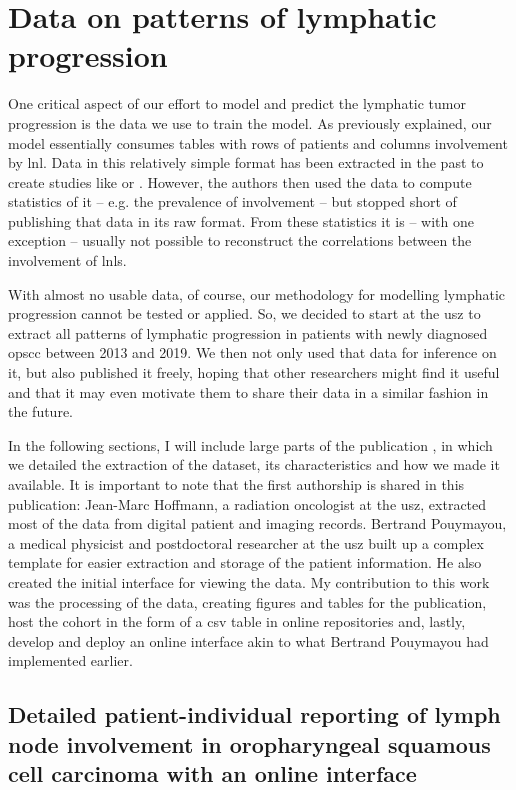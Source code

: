 \documentclass[\relativeRoot/main.tex]{subfiles}
\begin{document}
\chapter{Data on patterns of lymphatic progression}
\label{chap:dataset}

One critical aspect of our effort to model and predict the lymphatic tumor progression is the data we use to train the model. As previously explained, our model essentially consumes tables with rows of patients and columns involvement by \gls{lnl}. Data in this relatively simple format has been extracted in the past to create studies like \cite{candela_patterns_1990} or \cite{shah_patterns_1990}. However, the authors then used the data to compute statistics of it -- e.g. the prevalence of involvement -- but stopped short of publishing that data in its raw format. From these statistics it is -- with one exception \cite{sanguineti_defining_2009} -- usually not possible to reconstruct the correlations between the involvement of \glspl{lnl}.

With almost no usable data, of course, our methodology for modelling lymphatic progression cannot be tested or applied. So, we decided to start at the \gls{usz} to extract all patterns of lymphatic progression in patients with newly diagnosed \gls{opscc} between 2013 and 2019. We then not only used that data for inference on it, but also published it freely, hoping that other researchers might find it useful and that it may even motivate them to share their data in a similar fashion in the future.

In the following sections, I will include large parts of the publication \cite{ludwig_detailed_2022}, in which we detailed the extraction of the dataset, its characteristics and how we made it available. It is important to note that the first authorship is shared in this publication: Jean-Marc Hoffmann, a radiation oncologist at the \gls{usz}, extracted most of the data from digital patient and imaging records. Bertrand Pouymayou, a medical physicist and postdoctoral researcher at the \gls{usz} built up a complex template for easier extraction and storage of the patient information. He also created the initial interface for viewing the data. My contribution to this work was the processing of the data, creating figures and tables for the publication, host the cohort in the form of a \gls{csv} table in online repositories and, lastly, develop and deploy an online interface akin to what Bertrand Pouymayou had implemented earlier.

\section{Detailed patient-individual reporting of lymph node involvement in oropharyngeal squamous cell carcinoma with an online interface}
\label{sec:dataset:paper}



\end{document}
